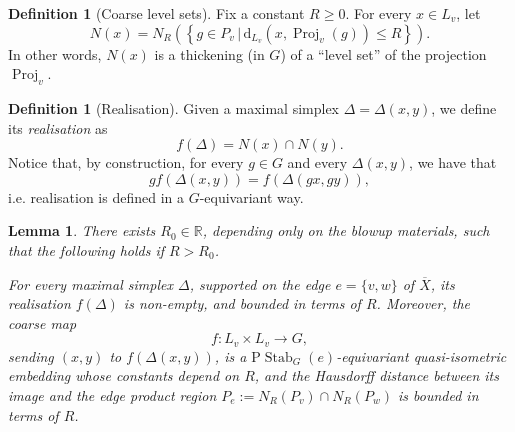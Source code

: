 \documentclass[svgnames]{amsart}
\theoremstyle{plain}
\newtheorem{lemma}[thm]{Lemma}
\theoremstyle{definition}
\newtheorem{defn}[thm]{Definition}
\newcommand{\ov}[1]{\overline{#1}}
\newcommand{\dist}{\mathrm{d}}
\newcommand{\Stab}[2]{\operatorname{Stab}_{#1}(#2)}
\newcommand{\Proj}{\operatorname{Proj}}
\begin{document}
\begin{defn}[Coarse level sets]
    Fix a constant $R\ge 0$. For every $x\in L_v$, let 
$$N(x)=N_{R}\left(\left\{g\in P_v\,|\,\dist_{L_v}(x, \Proj_{v}(g))\le R\right\}\right).$$
In other words, $N(x)$ is a thickening (in $G$) of a “level set” of the projection $\Proj_{v}$.
\end{defn}


\begin{defn}[Realisation]\label{defn:realisation}
Given a maximal simplex $\Delta=\Delta(x,y)$, we define its \emph{realisation} as
$$f(\Delta)=N(x)\cap N(y).$$
Notice that, by construction, for every $g\in G$ and every $\Delta(x,y)$, we have that 
$$gf(\Delta(x,y))=f(\Delta(gx,gy)),$$
i.e. realisation is defined in a $G$-equivariant way. \end{defn}

\begin{lemma}\label{lem:realisation_exists} There exists $R_0\in\mathbb{R}$, depending only on the blowup materials, such that the following holds if $R> R_0$. 

For every maximal simplex $\Delta$, supported on the edge $e=\{v,w\}$ of $\ov{X}$, its realisation $f(\Delta)$ is non-empty, and bounded in terms of $R$. Moreover, the coarse map $$f\colon L_v\times L_v\to G,$$ sending $(x,y)$ to $f(\Delta(x,y))$, is a $\text{P}\Stab{G}{e}$-equivariant quasi-isometric embedding whose constants depend on $R$, and the Hausdorff distance between its image and the \emph{edge product region} $P_e:=N_R(P_v)\cap N_R(P_w)$ is bounded in terms of $R$.
\end{lemma}
\end{document}
